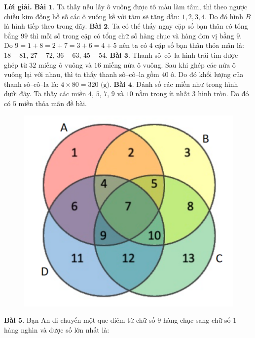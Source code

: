 	\begin{multicols}{2}
	\textbf{\color{toancuabi}Lời giải.}
	\vskip 0.1cm
	\textbf{\color{toancuabi}Bài $\pmb{1.}$} Ta thấy nếu lấy ô vuông được tô màu làm tâm, thì theo ngược chiều kim đồng hồ số các ô vuông kề với tâm sẽ tăng dần: $1,2,3,4$. Do đó hình $B$ là hình tiếp theo trong dãy.
	\vskip 0.1cm
	\textbf{\color{toancuabi}Bài $\pmb{2.}$} Ta có thể thấy ngay cặp số bạn thân có tổng bằng $99$ thì mỗi số trong cặp có tổng chữ số hàng chục và hàng đơn vị bằng $9$. Do $9 = 1+8 = 2+7 = 3+6 = 4+5$ nên ta có $4$ cặp số bạn thân thỏa mãn là: $18-81$, $27-72$, $36-63$, $45-54$.
	\vskip 0.1cm
	\textbf{\color{toancuabi}Bài $\pmb{3.}$} Thanh sô--cô--la hình trái tim được ghép từ $32$ miếng ô vuông và $16$ miếng nửa ô vuông. Sau khi ghép các nửa ô vuông lại với nhau, thì ta thấy thanh sô--cô--la gồm $40$ ô. Do đó khối lượng của thanh sô--cô--la là: $4\times 80=320 \text{ (g)}$.
	\vskip 0.1cm
	\textbf{\color{toancuabi}Bài $\pmb{4.}$} Đánh số các miền như trong hình dưới đây. Ta thấy các miền $4$, $5$, $7$, $9$ và $10$ nằm trong ít nhất $3$ hình tròn. Do đó có $5$ miền thỏa mãn đề bài.
	\begin{figure}[H]
		\vspace*{-5pt}
		\centering
		\captionsetup{labelformat= empty, justification=centering}
		\includegraphics[width= 0.7\linewidth]{7}
		\vspace*{-10pt}
	\end{figure}
	\textbf{\color{toancuabi}Bài $\pmb{5.}$} Bạn An di chuyển một que diêm từ chữ số $9$ hàng chục sang chữ số $1$ hàng nghìn và được số lớn nhất là:  
	\begin{figure}[H]
		\vspace*{-5pt}
		\centering
		\captionsetup{labelformat= empty, justification=centering}

\end{figure}
\end{multicols}
